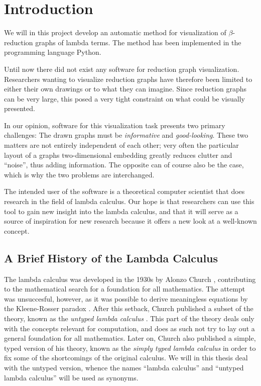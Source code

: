 
\chapter{Introduction}

We will in this project develop an automatic method for visualization of 
$\beta$-reduction graphs of lambda terms. The method has been implemented in 
the programming language Python.

Until now there did not exist any software for reduction graph visualization.
Researchers wanting to visualize reduction graphs have therefore been limited
to either their own drawings or to what they can imagine. Since reduction
graphs can be very large, this posed a very tight constraint on what could be
visually presented. 

In our opinion, software for this visualization task presents two primary
challenges: The drawn graphs must be \emph{informative} and
\emph{good-looking}. These two matters are not entirely independent of each
other; very often the particular layout of a graphs two-dimensional embedding
greatly reduces clutter and ``noise'', thus adding information. The opposite
can of course also be the case, which is why the two problems are
interchanged.

The intended user of the software is a theoretical computer scientist that
does research in the field of lambda calculus. Our hope is that researchers
can use this tool to gain new insight into the lambda calculus, and that it
will serve as a source of inspiration for new research because it offers a new
look at a well-known concept.

\section{A Brief History of the Lambda Calculus}

The lambda calculus was developed in the 1930s by Alonzo Church
\cite{Church1932}, contributing to the mathematical search for a foundation
for all mathematics. The attempt was unsuccesful, however, as it was possible
to derive meaningless equations by the Kleene-Rosser paradox
\cite{KleeneRosser1935}. After this setback, Church published a subset of the
theory, known as the \emph{untyped lambda calculus} \cite{Church1936}. This
part of the theory deals only with the concepts relevant for computation, and
does as such not try to lay out a general foundation for all mathematics.
Later on, Church also published a simple, typed version of his theory, known
as the \emph{simply typed lambda calculus} \cite{Church1940} in order to fix
some of the shortcomings of the original calculus. We will in this thesis deal
with the untyped version, whence the names ``lambda calculus'' and ``untyped
lambda calculus'' will be used as synonyms.

